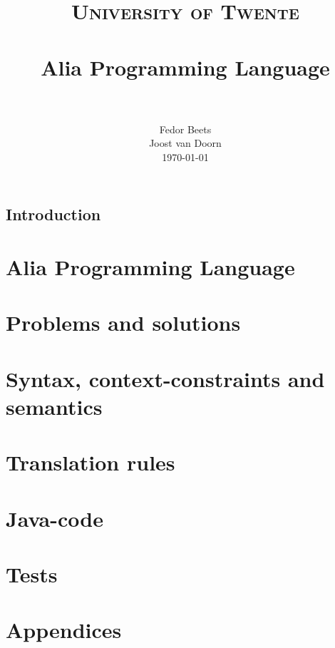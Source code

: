 \documentclass[paper=a4, fontsize=11pt]{report}
\title{
		\usefont{OT1}{bch}{b}{n}
		\normalfont \normalsize \textsc{University of Twente} \\ [25pt]
		\horrule{0.5pt} \\[0.4cm]
		\huge Alia Programming Language \\
		\horrule{2pt} \\[0.5cm]
}
\author{
		\normalfont 								\normalsize
        Fedor Beets\\[-3pt]		\normalsize
        Joost van Doorn\\[-3pt]		\normalsize
        \today
}
\date{}
\numberwithin{equation}{section}		%
\numberwithin{figure}{section}			%
\numberwithin{table}{section}				%
\begin{document}
\maketitle
\section*{Introduction}


\chapter{Alia Programming Language}


\chapter{Problems and solutions}

\chapter{Syntax, context-constraints and semantics}


\chapter{Translation rules} %

\chapter{Java-code}
\chapter{Tests}

\chapter{Appendices}
% 
\end{document}
